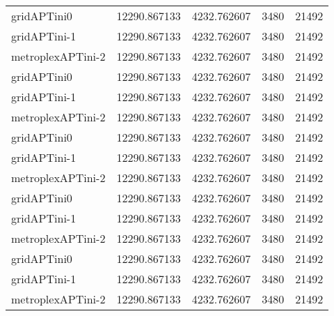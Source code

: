 \begin{table}[h]
\begin{longtable}{lrrrr}
gridAPTini0 & 12290.867133 & 4232.762607 & 3480 & 21492 \\
gridAPTini-1 & 12290.867133 & 4232.762607 & 3480 & 21492 \\
metroplexAPTini-2 & 12290.867133 & 4232.762607 & 3480 & 21492 \\
gridAPTini0 & 12290.867133 & 4232.762607 & 3480 & 21492 \\
gridAPTini-1 & 12290.867133 & 4232.762607 & 3480 & 21492 \\
metroplexAPTini-2 & 12290.867133 & 4232.762607 & 3480 & 21492 \\
gridAPTini0 & 12290.867133 & 4232.762607 & 3480 & 21492 \\
gridAPTini-1 & 12290.867133 & 4232.762607 & 3480 & 21492 \\
metroplexAPTini-2 & 12290.867133 & 4232.762607 & 3480 & 21492 \\
gridAPTini0 & 12290.867133 & 4232.762607 & 3480 & 21492 \\
gridAPTini-1 & 12290.867133 & 4232.762607 & 3480 & 21492 \\
metroplexAPTini-2 & 12290.867133 & 4232.762607 & 3480 & 21492 \\
gridAPTini0 & 12290.867133 & 4232.762607 & 3480 & 21492 \\
gridAPTini-1 & 12290.867133 & 4232.762607 & 3480 & 21492 \\
metroplexAPTini-2 & 12290.867133 & 4232.762607 & 3480 & 21492 \\
\end{longtable}
\end{table}

